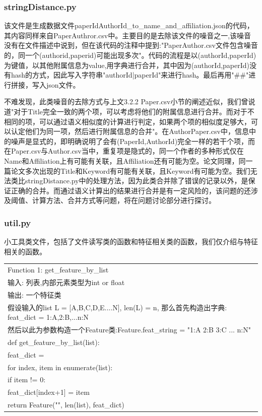 \documentclass{mcmthesis}
\begin{document}
		\subsubsection{stringDistance.py}
		\par 该文件是生成数据文件paperIdAuthorId\_to\_name\_and\_affiliation.json的代码，其内容同样来自PaperAuthror.csv中。主要目的是去除该文件的噪音之一,该噪音没有在文件描述中说到，但在该代码的注释中提到:"PaperAuthor.csv文件包含噪音的，同一个(authorid,paperid)可能出现多次"。代码的流程是以(authorId,paperId)为键值，以其他附属信息为value,用字典进行合并，其中因为(authorId,paperId)没有hash的方式，因此写入字符串"authorId|paperId"来进行hash。最后再用"\#\#"进行拼接，写入json文件。
		\par 不难发现，此类噪音的去除方式与上文3.2.2 Paper.csv小节的阐述近似，我们曾说道"对于Title完全一致的两个项，可以考虑将他们的附属信息进行合并。而对于不相同的项，可以通过语义相似度的计算进行判定，如果两个项的相似度足够大，可以认定他们为同一项，然后进行附属信息的合并"。在AuthorPaper.csv中，信息中的噪声是显式的，即明确说明了会有(PaperId,AuthorId)完全一样的若干个项，而在Paper.csv与Author.csv当中，重复项是隐式的，同一个作者的多种形式仅在Name和Affiliation上有可能有关联，且Affiliation还有可能为空。论文同理，同一篇论文多次出现的Title和Keyword有可能有关联，且Keyword有可能为空。我们无法类比stringDistance.py中的处理方法，因为此类合并除了错误的记录以外，是保证正确的合并。而通过语义计算出的结果进行合并是有一定风险的，该问题的还涉及阈值、计算方法、合并方式等问题，将在问题讨论部分进行探讨。
		
		\subsubsection{util.py}
		\par 小工具类文件，包括了文件读写类的函数和特征相关类的函数，我们仅介绍与特征相关的函数。
		\hspace*{\fill} \\
		\begin{tabular}{l}
			\hline
			Function 1: get\_feature\_by\_list \\
			输入: 列表,内部元素类型为int or float \\
			输出: 一个特征类 \\
			假设输入的list L = [A,B,C,D,E....N], len(L) = n, 那么首先构造出字典: feat\_dict = {1:A,2:B,...n:N} \\
			然后以此为参数构造一个Feature类:Feature.feat\_string = "1:A 2:B 3:C ... n:N" \\
			\hline
			def get\_feature\_by\_list(list): \\
			\qquad feat\_dict = {} \\
			\qquad for index, item in enumerate(list): \\
			\qquad \qquad if item != 0: \\
			\qquad \qquad \qquad feat\_dict[index+1] = item \\
			\qquad return Feature("", len(list), feat\_dict) \\ 
			\hline
		\end{tabular}
		
\end{document}

